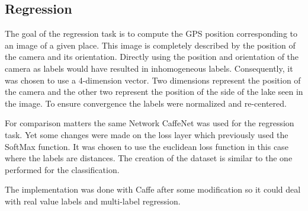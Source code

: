 \subsection{Regression}
The goal of the regression task is to compute the GPS position corresponding to an image of a given place. This image is completely described by the position of the camera and its orientation. Directly using the position and orientation of the camera as labels would have resulted in inhomogeneous labels. Consequently, it was chosen to use a 4-dimension vector. Two dimensions represent the position of the camera and the other two represent the position of the side of the lake seen in the image. To ensure convergence the labels were normalized and re-centered.

For comparison matters the same Network CaffeNet was used for the regression task. Yet some changes were made on the loss layer which previously used the SoftMax function. It was chosen to use the euclidean loss function in this case where the labels are distances. The creation of the dataset is similar to the one performed for the classification.

The implementation was done with Caffe after some modification so it could deal with real value labels and multi-label regression.